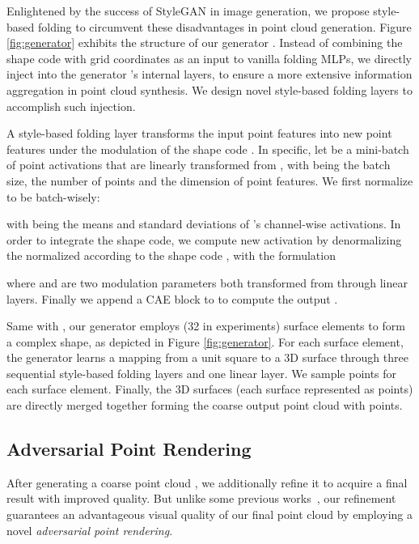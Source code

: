\documentclass[final]{cvpr}
\begin{document}
Enlightened by the success of StyleGAN \cite{karras2019style} in image generation, we propose style-based folding to circumvent these disadvantages in point cloud generation. 
Figure \ref{fig:generator} exhibits the structure of our generator .
Instead of combining the shape code  with grid coordinates as an input to vanilla folding MLPs, we directly inject  into the generator 's internal layers, to ensure a more extensive information aggregation in point cloud synthesis.
We design novel style-based folding layers to accomplish such injection. 

A style-based folding layer transforms the input point features  into new point features  under the modulation of the shape code .
In specific, let  be a mini-batch of point activations that are linearly transformed from , with  being the batch size,  the number of points and  the dimension of point features. We first normalize  to be  batch-wisely: 
\vspace{-0.5em}

with  being the means and standard deviations of 's channel-wise activations.
In order to integrate the shape code, we compute new activation  by denormalizing the normalized  according to the shape code , with the formulation
\vspace{-0.5em}
 
where  and  are two modulation parameters both transformed from  through linear layers.
Finally we append a CAE block to  to compute the output .

Same with \cite{atlasnet2018,liu2019morphing}, our generator  employs  (32 in experiments) surface elements to form a complex shape, as depicted in Figure \ref{fig:generator}. For each surface element, the generator learns a mapping from a unit square  to a 3D surface through three sequential style-based folding layers and one linear layer. We sample  points for each surface element. Finally, the  3D surfaces (each surface represented as  points) are directly merged together forming the coarse output point cloud  with  points.

\subsection{Adversarial Point Rendering}
\label{sec:rendering}
After generating a coarse point cloud , we additionally refine it to acquire a final result  with improved quality. But unlike some previous works~\cite{liu2019morphing,cascaded_2020_CVPR}, our refinement guarantees an advantageous visual quality of our final point cloud  by employing a novel \emph{adversarial point rendering}. 
\end{document}

